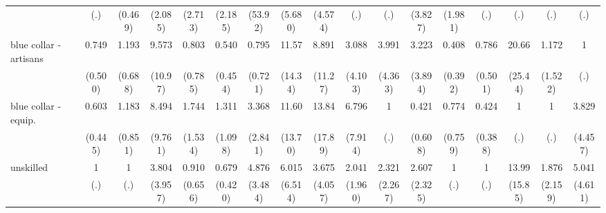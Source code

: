{\begin{tabular}{l*{16}{c}}
                    &         (.)         &     (0.469)         &     (2.085)         &     (2.713)         &     (2.185)         &     (53.92)         &     (5.680)         &     (4.574)         &         (.)         &         (.)         &     (3.827)         &     (1.981)         &         (.)         &         (.)         &         (.)         &         (.)         \\
[1em]
blue collar - artisans&       0.749         &       1.193         &       9.573\sym{*}  &       0.803         &       0.540         &       0.795         &       11.57\sym{*}  &       8.891         &       3.088         &       3.991         &       3.223         &       0.408         &       0.786         &       20.66\sym{*}  &       1.172         &           1         \\
                    &     (0.500)         &     (0.688)         &     (10.97)         &     (0.785)         &     (0.454)         &     (0.721)         &     (14.34)         &     (11.27)         &     (4.103)         &     (4.363)         &     (3.894)         &     (0.392)         &     (0.501)         &     (25.44)         &     (1.522)         &         (.)         \\
[1em]
blue collar - equip.&       0.603         &       1.183         &       8.494         &       1.744         &       1.311         &       3.368         &       11.60\sym{*}  &       13.84\sym{*}  &       6.796         &           1         &       0.421         &       0.774         &       0.424         &           1         &           1         &       3.829         \\
                    &     (0.445)         &     (0.851)         &     (9.761)         &     (1.534)         &     (1.098)         &     (2.841)         &     (13.70)         &     (17.89)         &     (7.914)         &         (.)         &     (0.608)         &     (0.759)         &     (0.388)         &         (.)         &         (.)         &     (4.457)         \\
[1em]
unskilled           &           1         &           1         &       3.804         &       0.910         &       0.679         &       4.876\sym{*}  &       6.015         &       3.675         &       2.041         &       2.321         &       2.607         &           1         &           1         &       13.99\sym{*}  &       1.876         &       5.041         \\
                    &         (.)         &         (.)         &     (3.957)         &     (0.656)         &     (0.420)         &     (3.484)         &     (6.514)         &     (4.057)         &     (1.960)         &     (2.267)         &     (2.325)         &         (.)         &         (.)         &     (15.85)         &     (2.159)         &     (4.611)         \\

\end{tabular}}
